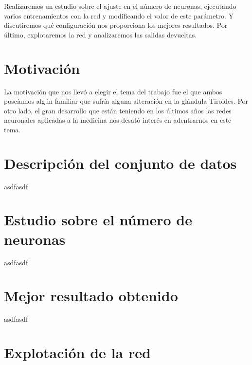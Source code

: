 \documentclass[a4paper,12pt,titlepage]{article}
\begin{document}
Realizaremos un estudio sobre el ajuste en el número de neuronas, ejecutando varios entrenamientos con la red y modificando el valor de este parámetro. Y discutiremos qué configuración nos proporciona los mejores resultados. Por último, explotaremos la red y analizaremos las salidas devueltas.

\section{Motivación}

La motivación que nos llevó a elegir el tema del trabajo fue el que ambos poseíamos algún familiar que sufría alguna alteración en la glándula Tiroides. Por otro lado,  el gran desarrollo que están teniendo en los últimos años las redes neuronales aplicadas a la medicina nos desató interés en adentrarnos en este tema.

\section{Descripción del conjunto de datos}

asdfasdf

\section{Estudio sobre el número de neuronas}

asdfasdf

\section{Mejor resultado obtenido}

asdfasdf

\section{Explotación de la red}


%
%
\end{document}
